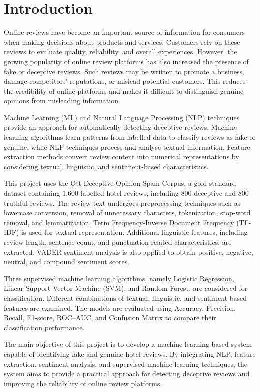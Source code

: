\documentclass[12pt,a4paper]{report}
\begin{document}
\chapter{Introduction}

Online reviews have become an important source of information
for consumers when making decisions about products and services.
Customers rely on these reviews to evaluate quality, reliability,
and overall experiences. However, the growing popularity of
online review platforms has also increased the presence of
fake or deceptive reviews. Such reviews may be written to
promote a business, damage competitors' reputations, or
mislead potential customers. This reduces the credibility
of online platforms and makes it difficult to distinguish
genuine opinions from misleading information.

Machine Learning (ML) and Natural Language Processing (NLP)
techniques provide an approach for automatically detecting
deceptive reviews. Machine learning algorithms learn patterns
from labelled data to classify reviews as fake or genuine,
while NLP techniques process and analyse textual information.
Feature extraction methods convert review content into
numerical representations by considering textual, linguistic,
and sentiment-based characteristics.

This project uses the Ott Deceptive Opinion Spam Corpus,
a gold-standard dataset containing 1,600 labelled hotel
reviews, including 800 deceptive and 800 truthful reviews.
The review text undergoes preprocessing techniques such as
lowercase conversion, removal of unnecessary characters,
tokenization, stop-word removal, and lemmatization.
Term Frequency-Inverse Document Frequency (TF-IDF)
is used for textual representation. Additional linguistic
features, including review length, sentence count, and
punctuation-related characteristics, are extracted.
VADER sentiment analysis is also applied to obtain
positive, negative, neutral, and compound sentiment scores.

Three supervised machine learning algorithms, namely
Logistic Regression, Linear Support Vector Machine (SVM),
and Random Forest, are considered for classification.
Different combinations of textual, linguistic, and
sentiment-based features are examined. The models are
evaluated using Accuracy, Precision, Recall, F1-score,
ROC--AUC, and Confusion Matrix to compare their
classification performance.

The main objective of this project is to develop a
machine learning-based system capable of identifying
fake and genuine hotel reviews. By integrating NLP,
feature extraction, sentiment analysis, and supervised
machine learning techniques, the system aims to provide
a practical approach for detecting deceptive reviews
and improving the reliability of online review platforms.
\end{document}
